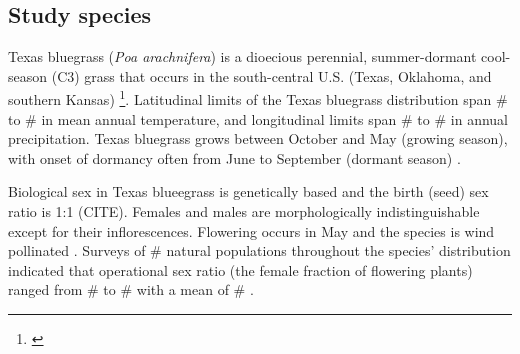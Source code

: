 \documentclass[12pt]{article}\usepackage[]{graphicx}\usepackage[dvipsnames]{xcolor}
\newcommand{\tom}[2]{{\color{red}{#1}}\footnote{\textit{\color{red}{#2}}}}
\begin{document}
\subsection*{Study species}
Texas bluegrass (\textit{Poa arachnifera}) is a dioecious perennial, summer-dormant cool-season (C3) grass that occurs in the south-central U.S. (Texas, Oklahoma, and southern Kansas) \citep{hitchcock1971manual}\tom{}{I would reference the map figure (current Fig. 1) here. I also suggest either adding the GBIF records to this figure or adding the county occurrences as in the Am Nat paper, because it is important for readers to see the natural distribution early in the paper. The natural population surveys can be cut from this figure because you don't say anything about them and you do not use the data here. ALternatively, there may be value in re-analyzing the sex ratio surveys with your climate covariates. Fig 1 also needs to be updated with labels and units on the climate variable color bars. I recommend putting panels A-C and B-D on the same climate scale.}. 
Latitudinal limits of the Texas bluegrass distribution span \# to \# in mean annual temperature, and longitudinal limits span \# to \# in annual precipitation. 
Texas bluegrass grows between October and May (growing season), with onset of dormancy often from June to September (dormant season) \citep{kindiger2004interspecific}. 

Biological sex in Texas blueegrass is genetically based and the birth (seed) sex ratio is 1:1 (CITE). 
Females and males are morphologically indistinguishable except for their inflorescences. 
Flowering occurs in May and the species is wind pollinated \citep{hitchcock1971manual}. 
Surveys of \# natural populations throughout the species' distribution indicated that operational sex ratio (the female fraction of flowering plants) ranged from \# to \# with a mean of \# \citep{miller2022two}. 
\end{document}
